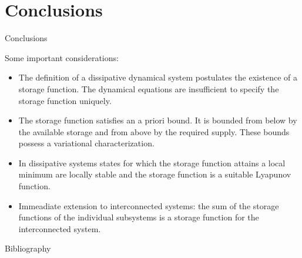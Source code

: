 \documentclass[aspectratio=169]{beamer}
\begin{document}
\section{Conclusions}


\begin{frame}{Conclusions}
	
	Some important considerations:
	\begin{itemize}
		\item The definition of a dissipative dynamical system postulates the existence of a
		storage function. The dynamical equations are insufficient to specify the storage function uniquely.
		\item  The storage function satisfies an a priori bound. It is bounded from below by the available storage and from above by the required supply. These bounds possess a variational characterization.
		\item In dissipative systems states for which the storage function attains a local minimum are
		locally stable and the storage function is a suitable Lyapunov function.
		\item Immeadiate extension to interconnected systems: the sum of the
		storage functions of the individual subsystems is a storage function for
		the interconnected system.
	\end{itemize}

	
\end{frame}

\begin{frame}{Bibliography}
	\nocite{*}
	\printbibliography
\end{frame}

\appendix



	
\end{document}
